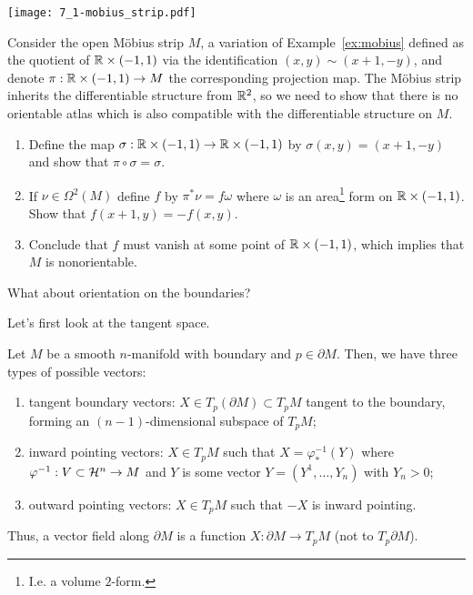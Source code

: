 \begin{marginfigure}
  \texttt{[image: 7\_1-mobius\_strip.pdf]}
\end{marginfigure}

\begin{exercise}
  Consider the open M\"obius strip $M$, a variation of Example~\ref{ex:mobius} defined as the quotient of $\mathbb{R}\times(-1,1)$ via the identification $(x,y) \sim (x+1, -y)$, and denote $\pi: \mathbb{R}\times(-1,1)\to M$ the corresponding projection map.
  The M\"obius strip inherits the differentiable structure from $\mathbb{R}^2$, so we need to show that there is no orientable atlas which is also compatible with the differentiable structure on $M$.
  \begin{enumerate}
    \item Define the map $\sigma:\mathbb{R}\times(-1,1)\to\mathbb{R}\times(-1,1)$ by $\sigma(x,y) = (x+1, -y)$ and show that $\pi\circ\sigma = \sigma$.
    \item If $\nu\in\Omega^2(M)$ define $f$ by $\pi^* \nu = f \omega$ where $\omega$ is an area\footnote{I.e. a volume $2$-form.} form on $\mathbb{R}\times(-1,1)$.
    Show that $f(x+1, y) = - f(x,y)$.
    \item Conclude that $f$ must vanish at some point of $\mathbb{R}\times(-1,1)$, which implies that $M$ is nonorientable.
  \end{enumerate}
\end{exercise}

What about orientation on the boundaries?

Let's first look at the tangent space. 

Let $M$ be a smooth $n$-manifold with boundary and $p\in \partial M$.
Then, we have three types of possible vectors:
\begin{enumerate}
  \item tangent boundary vectors: $X\in T_p(\partial M)\subset T_p M$ tangent to the boundary, forming an $(n-1)$-dimensional subspace of $T_p M$;
  \item inward pointing vectors: $X\in T_pM$ such that $X = \varphi^{-1}_*(Y)$ where $\varphi^{-1}: V\subset \mathcal{H}^n \to M$ and $Y$ is some vector $Y = (Y^1, \ldots, Y_n)$ with $Y_n > 0$;
  \item outward pointing vectors: $X\in T_pM$ such that $-X$ is inward pointing.
\end{enumerate}
Thus, a vector field along $\partial M$ is a function $X:\partial M\to T_pM$ (not to $T_p\partial M$).

